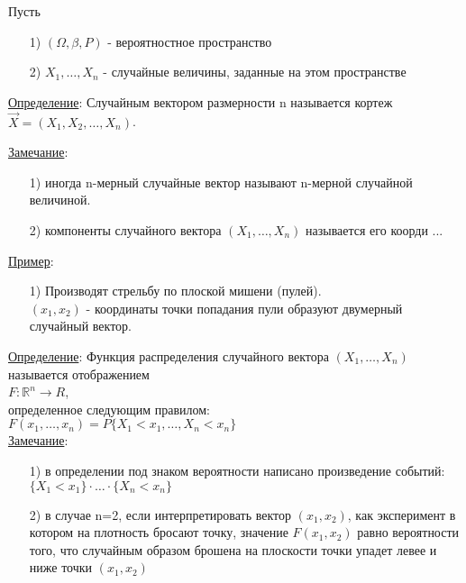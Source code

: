 Пусть 
\begin{enumerate}
\item[1)] $(\Omega, \beta, P)$ - вероятностное пространство

\item[2)] $X_1, \ldots, X_n$ - случайные величины, заданные на этом пространстве
\end{enumerate}


\underline{Определение}: Случайным вектором размерности n называется кортеж $\vec{X} =  (X_1, X_2, \ldots, X_n)$.

\underline{Замечание}:
\begin{enumerate}
\item[1)] иногда n-мерный случайные вектор называют n-мерной случайной величиной.

\item[2)] компоненты случайного вектора $(X_1, \ldots, X_n)$ называется его коорди ...
\end{enumerate}


\underline{Пример}:
\begin{enumerate}
\item[1)] Производят стрельбу по плоской мишени (пулей). \\
$(x_1, x_2)$ - координаты точки попадания пули образуют двумерный случайный вектор.
\end{enumerate}

\underline{Определение}: Функция распределения случайного вектора $(X_1, \ldots, X_n)$ называется отображением \\
$F: \mathbb{R}^n \to R$, \\
определенное следующим правилом: \\
$F(x_1, \ldots, x_n) = P\{X_1 < x_1, \ldots , X_n < x_n\}$ \\

\underline{Замечание}:
\begin{enumerate}
\item[1)] в определении под знаком вероятности написано произведение событий: \\
$\{X_1 < x_1\} \cdot \ldots \cdot \{X_n < x_n\}$

\item[2)] в случае n=2, если интерпретировать вектор $(x_1, x_2)$, как эксперимент в котором на плотность бросают точку, значение $F(x_1, x_2)$ равно вероятности того, что случайным образом брошена на плоскости точки упадет левее и ниже точки $(x_1, x_2)$
\end{enumerate}


